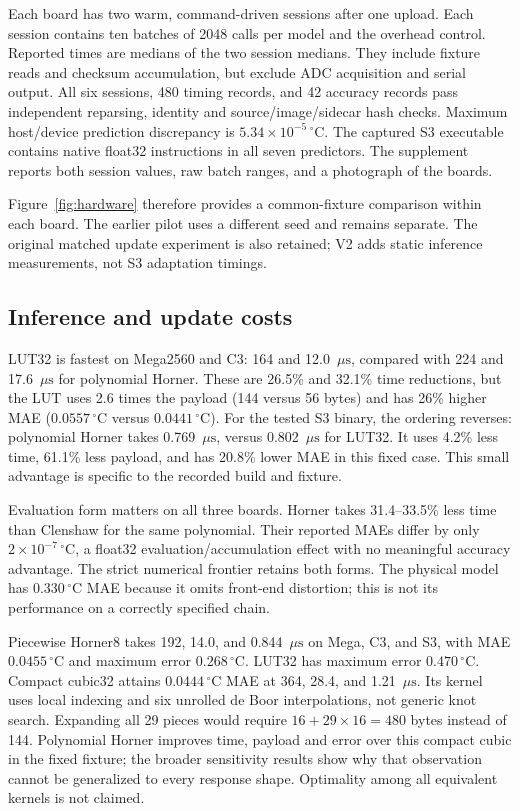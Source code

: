 \documentclass[journal,twoside,web]{ieeecolor}
\newcommand{\degC}{\ensuremath{^{\circ}\mathrm{C}}}
\newcommand{\us}{\ensuremath{\mu\mathrm{s}}}
\begin{document}
Each board has two warm, command-driven sessions after one upload. Each session contains ten batches of 2048 calls per model and the overhead control. Reported times are medians of the two session medians. They include fixture reads and checksum accumulation, but exclude ADC acquisition and serial output. All six sessions, 480 timing records, and 42 accuracy records pass independent reparsing, identity and source/image/sidecar hash checks. Maximum host/device prediction discrepancy is $5.34\times10^{-5}\,\degC$. The captured S3 executable contains native float32 instructions in all seven predictors. The supplement reports both session values, raw batch ranges, and a photograph of the boards.

Figure~\ref{fig:hardware} therefore provides a common-fixture comparison within each board. The earlier pilot uses a different seed and remains separate. The original matched update experiment is also retained; V2 adds static inference measurements, not S3 adaptation timings.

\subsection{Inference and update costs}
\normalcolor
LUT32 is fastest on Mega2560 and C3: 164 and 12.0~\us{}, compared with 224 and 17.6~\us{} for polynomial Horner. These are 26.5\% and 32.1\% time reductions, but the LUT uses 2.6 times the payload (144 versus 56 bytes) and has 26\% higher MAE ($0.0557\,\degC$ versus $0.0441\,\degC$). For the tested S3 binary, the ordering reverses: polynomial Horner takes 0.769~\us{}, versus 0.802~\us{} for LUT32. It uses 4.2\% less time, 61.1\% less payload, and has 20.8\% lower MAE in this fixed case. This small advantage is specific to the recorded build and fixture.

Evaluation form matters on all three boards. Horner takes 31.4--33.5\% less time than Clenshaw for the same polynomial. Their reported MAEs differ by only $2\times10^{-7}\,\degC$, a float32 evaluation/accumulation effect with no meaningful accuracy advantage. The strict numerical frontier retains both forms. The physical model has $0.330\,\degC$ MAE because it omits front-end distortion; this is not its performance on a correctly specified chain.

Piecewise Horner8 takes 192, 14.0, and 0.844~\us{} on Mega, C3, and S3, with MAE $0.0455\,\degC$ and maximum error $0.268\,\degC$. LUT32 has maximum error $0.470\,\degC$. Compact cubic32 attains $0.0444\,\degC$ MAE at 364, 28.4, and 1.21~\us. Its kernel uses local indexing and six unrolled de Boor interpolations, not generic knot search. Expanding all 29 pieces would require $16+29\times16=480$ bytes instead of 144. Polynomial Horner improves time, payload and error over this compact cubic in the fixed fixture; the broader sensitivity results show why that observation cannot be generalized to every response shape. Optimality among all equivalent kernels is not claimed.
\end{document}
